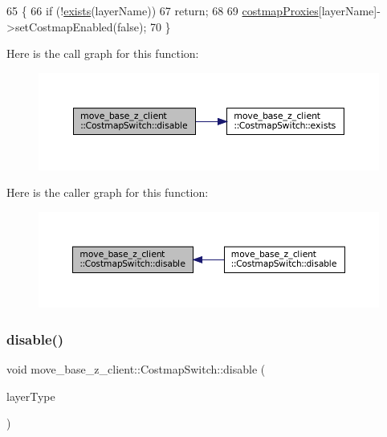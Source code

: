 \begin{DoxyCode}
65 \{
66     \textcolor{keywordflow}{if} (!\hyperlink{classmove__base__z__client_1_1CostmapSwitch_a3898ad9aa2ecf59d29a99e152f21a0d4}{exists}(layerName))
67         \textcolor{keywordflow}{return};
68 
69     \hyperlink{classmove__base__z__client_1_1CostmapSwitch_ab9b33bc5774b41e5898718ffdcfcbc25}{costmapProxies}[layerName]->setCostmapEnabled(\textcolor{keyword}{false});
70 \}
\end{DoxyCode}
Here is the call graph for this function\+:
\nopagebreak
\begin{figure}[H]
\begin{center}
\leavevmode
\includegraphics[width=350pt]{classmove__base__z__client_1_1CostmapSwitch_a14a70c2952a2bf34b2f8a383fdd5841f_cgraph}
\end{center}
\end{figure}
Here is the caller graph for this function\+:
\nopagebreak
\begin{figure}[H]
\begin{center}
\leavevmode
\includegraphics[width=350pt]{classmove__base__z__client_1_1CostmapSwitch_a14a70c2952a2bf34b2f8a383fdd5841f_icgraph}
\end{center}
\end{figure}
\mbox{\label{classmove__base__z__client_1_1CostmapSwitch_acc493a0039e529f11b3f49818f38c5ff}} 
\subsubsection{\texorpdfstring{disable()}{disable()}\hspace{0.1cm}{\footnotesize\ttfamily [2/2]}}
{\footnotesize\ttfamily void move\+\_\+base\+\_\+z\+\_\+client\+::\+Costmap\+Switch\+::disable (\begin{DoxyParamCaption}\item[{\hyperlink{classmove__base__z__client_1_1CostmapSwitch_a810338d2ba3fe25fc4ecf8c6c85b462b}{Standard\+Layers}}]{layer\+Type }\end{DoxyParamCaption})}



